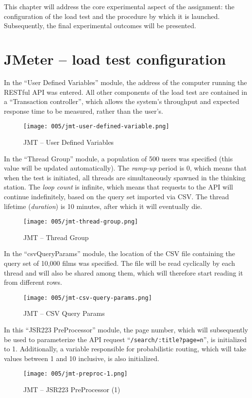 This chapter will address the core experimental aspect of the assignment: the configuration of the load test and the procedure by which it is launched.
Subsequently, the final experimental outcomes will be presented.

\section{JMeter – load test configuration}

In the ``User Defined Variables'' module, the address of the computer running the RESTful API was entered.
All other components of the load test are contained in a ``Transaction controller'', which allows the system's throughput and expected response time to be measured, rather than the user's.
\begin{figure}[h]
	\centering
	\texttt{[image: 005/jmt-user-defined-variable.png]}
	\caption{JMT -- User Defined Variables}
\end{figure}

\clearpage

In the ``Thread Group'' module, a population of 500 users was specified (this value will be updated automatically).
The \textit{ramp-up} period is 0, which means that when the test is initiated, all threads are simultaneously spawned in the thinking station.
The \textit{loop count} is infinite, which means that requests to the API will continue indefinitely, based on the query set imported via CSV.
The thread lifetime (\textit{duration}) is 10 minutes, after which it will eventually die.
\begin{figure}[h]
	\centering
	\texttt{[image: 005/jmt-thread-group.png]}
	\caption{JMT -- Thread Group}
\end{figure}

In the ``csvQueryParams'' module, the location of the CSV file containing the query set of 10,000 films was specified.
The file will be read cyclically by each thread and will also be shared among them, which will therefore start reading it from different rows.
\begin{figure}[h]
	\centering
	\texttt{[image: 005/jmt-csv-query-params.png]}
	\caption{JMT -- CSV Query Params}
\end{figure}

\clearpage

In this ``JSR223 PreProcessor'' module, the page number, which will subsequently be used to parameterize the API request ``\verb|/search/:title?page=n|'', is initialized to 1.
Additionally, a variable responsible for probabilistic routing, which will take values between 1 and 10 inclusive, is also initialized.
\begin{figure}[h]
	\centering
	\texttt{[image: 005/jmt-preproc-1.png]}
	\caption{JMT -- JSR223 PreProcessor (1)}
\end{figure}

